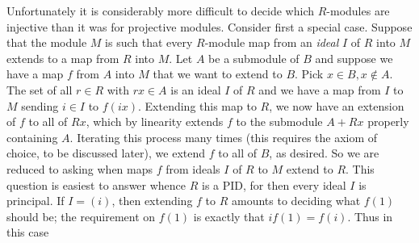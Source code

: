 \documentclass[10pt]{article}
\begin{document}
Unfortunately it is considerably more difficult to decide which
$R$-modules are injective than it was for projective modules. Consider
first a special case. Suppose that the module $M$ is such that every
$R$-module map from an {\sl ideal} $I$ of $R$ into $M$ extends to a map
from $R$ into $M$. Let $A$ be a submodule of $B$ and suppose we have a
map $f$ from $A$ into $M$ that we want to extend to $B$. Pick $x\in
B,x\notin A$. The set of all $r\in R$ with $rx\in A$ is an ideal $I$ of
$R$ and we have a map from $I$ to $M$ sending $i\in I$ to $f(ix)$.
Extending this map to $R$, we now have an extension of $f$ to all of
$Rx$, which by linearity extends $f$ to the submodule $A+Rx$ properly
containing $A$. Iterating this process many times (this requires the
axiom of choice, to be discussed later), we extend $f$ to all of $B$, as
desired. So we are reduced to asking when maps $f$ from ideals $I$ of
$R$ to $M$ extend to $R$. This question is easiest to answer whence $R$
is a PID, for then every ideal $I$ is principal. If $I=(i)$, then
extending $f$ to $R$ amounts to deciding what $f(1)$ should be; the
requirement on $f(1)$ is exactly that $if(1) = f(i)$. Thus in this case
\end{document}
